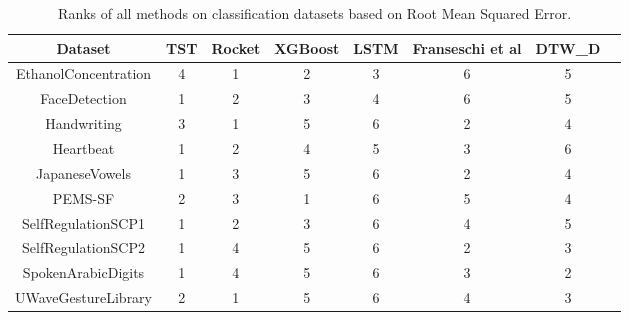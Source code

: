\documentclass{article} \usepackage{iclr2021_conference,times}
\begin{document}
\begin{table}
\centering
\begin{adjustbox}{width=1.2\textwidth,center=\textwidth}

\begin{tabular}{|c|c|c|c|c|c|c|c|} 
\hline
Dataset              & TST & Rocket & XGBoost & LSTM & Franseschi et al & DTW\_D   \\ 
\hline
EthanolConcentration & 4   & 1      & 2       & 3    & 6                & 5      \\
FaceDetection        & 1   & 2      & 3       & 4    & 6                & 5  \\
Handwriting          & 3   & 1      & 5       & 6    & 2                & 4     \\
Heartbeat            & 1   & 2      & 4       & 5    & 3                & 6    \\
JapaneseVowels       & 1   & 3      & 5       & 6    & 2                & 4     \\
PEMS-SF              & 2   & 3      & 1       & 6    & 5                & 4     \\
SelfRegulationSCP1   & 1   & 2      & 3       & 6    & 4                & 5     \\
SelfRegulationSCP2   & 1   & 4      & 5       & 6    & 2                & 3    \\
SpokenArabicDigits   & 1   & 4      & 5       & 6    & 3                & 2    \\
UWaveGestureLibrary  & 2   & 1      & 5       & 6    & 4                & 3    \\
\hline
\end{tabular}
\end{adjustbox}
\caption{Ranks of all methods on classification datasets based on Root Mean Squared Error.}
\end{table}
\end{document}
